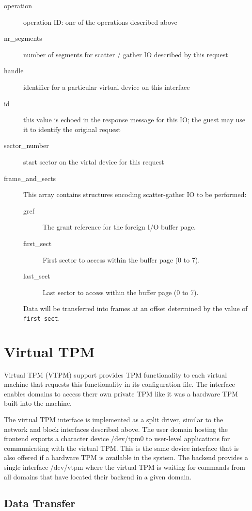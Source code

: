 \documentclass[11pt,twoside,final,openright]{report}
\begin{document}
\begin{description}
\item[operation] operation ID: one of the operations described above
\item[nr\_segments] number of segments for scatter / gather IO
  described by this request
\item[handle] identifier for a particular virtual device on this
  interface
\item[id] this value is echoed in the response message for this IO;
  the guest may use it to identify the original request
\item[sector\_number] start sector on the virtal device for this
  request
\item[frame\_and\_sects] This array contains structures encoding
  scatter-gather IO to be performed:
  \begin{description}
  \item[gref] The grant reference for the foreign I/O buffer page.
  \item[first\_sect] First sector to access within the buffer page (0 to 7).
  \item[last\_sect] Last sector to access within the buffer page (0 to 7).
  \end{description}
  Data will be transferred into frames at an offset determined by the
  value of {\tt first\_sect}.
\end{description}

\section{Virtual TPM}

Virtual TPM (VTPM) support provides TPM functionality to each virtual
machine that requests this functionality in its configuration file.
The interface enables domains to access therr own private TPM like it
was a hardware TPM built into the machine.

The virtual TPM interface is implemented as a split driver,
similar to the network and block interfaces described above.
The user domain hosting the frontend exports a character device /dev/tpm0
to user-level applications for communicating with the virtual TPM.
This is the same device interface that is also offered if a hardware TPM
is available in the system. The backend provides a single interface
/dev/vtpm where the virtual TPM is waiting for commands from all domains
that have located their backend in a given domain.

\subsection{Data Transfer}
\end{document}
